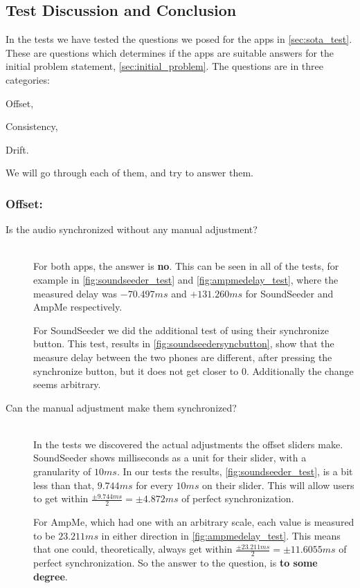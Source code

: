 \subsection{Test Discussion and Conclusion}

In the tests we have tested the questions we posed for the apps in \vref{sec:sota_test}.
These are questions which determines if the apps are suitable answers for the initial problem statement, \vref{sec:initial_problem}.
The questions are in three categories: 
\begin{enumerate*}[label=(\alph*)]
    \item Offset,
    \item Consistency,
    \item Drift.
\end{enumerate*}
We will go through each of them, and try to answer them.

\subsubsection*{Offset:}
\begin{description}
    \item[Is the audio synchronized without any manual adjustment?] \hfill \\
    For both apps, the answer is \textbf{no}. 
    This can be seen in all of the tests, for example in \vref{fig:soundseeder_test} and \vref{fig:ampmedelay_test}, where the measured delay was $-70.497 ms$ and $+131.260 ms$ for SoundSeeder and AmpMe respectively.
    
    For SoundSeeder we did the additional test of using their synchronize button. 
    This test, results in \vref{fig:soundseedersyncbutton}, show that the measure delay between the two phones are different, after pressing the synchronize button, but it does not get closer to $0$. 
    Additionally the change seems arbitrary.  
    \item[Can the manual adjustment make them synchronized?] \hfill \\
    In the tests we discovered the actual adjustments the offset sliders make. 
    SoundSeeder shows milliseconds as a unit for their slider, with a granularity of $10 ms$.
    In our tests the results, \vref{fig:soundseeder_test}, is a bit less than that, $9.744 ms$ for every $10 ms$ on their slider.
    This will allow users to get within $\frac{\pm9.744 ms}{2}=\pm 4.872 ms$ of perfect synchronization.
    
    For AmpMe, which had one with an arbitrary scale, each value is measured to be $23.211 ms$ in either direction in \vref{fig:ampmedelay_test}.
    This means that one could, theoretically, always get within $\frac{\pm23.211 ms}{2}=\pm 11.6055 ms$ of perfect synchronization. 
    So the answer to the question, is \textbf{to some degree}.
\end{description}

